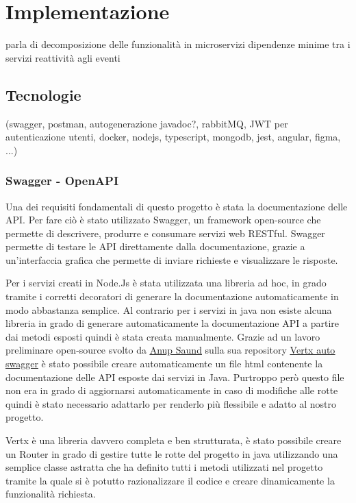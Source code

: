\chapter{Implementazione}
\label{ch:implementazione} %
parla di decomposizione delle funzionalità in microservizi
dipendenze minime tra i servizi
reattività agli eventi
\section{Tecnologie}
(swagger, postman, autogenerazione javadoc?, rabbitMQ, JWT per autenticazione utenti,
 docker, nodejs, typescript, mongodb, jest, angular, figma, ...)

\subsection{Swagger - OpenAPI}

Una dei requisiti fondamentali di questo progetto è stata la documentazione delle API.
Per fare ciò è stato utilizzato Swagger, un framework open-source che permette di descrivere, produrre e consumare servizi web RESTful. 
Swagger permette di testare le API direttamente dalla documentazione, grazie a un'interfaccia grafica che permette di inviare richieste e visualizzare le risposte.

Per i servizi creati in Node.Js è stata utilizzata una libreria ad hoc, in grado tramite i corretti decoratori di generare la documentazione automaticamente in modo abbastanza semplice.
Al contrario per i servizi in java non esiste alcuna libreria in grado di generare automaticamente la documentazione API a partire dai metodi esposti quindi è stata creata manualmente.
Grazie ad un lavoro preliminare open-source svolto da \href{https://github.com/anupsaund}{\underline{Anup Saund}} sulla sua repository \href{https://github.com/anupsaund/vertx-auto-swagger}{\underline{Vertx auto swagger}}
è stato possibile creare automaticamente un file html contenente la documentazione delle API esposte dai servizi in Java. 
Purtroppo però questo file non era in grado di aggiornarsi automaticamente in caso di modifiche alle rotte quindi è stato necessario adattarlo per renderlo più flessibile e adatto al nostro progetto.

Vertx è una libreria davvero completa e ben strutturata, è stato possibile creare un Router in grado di gestire tutte le rotte del progetto in java 
utilizzando una semplice classe astratta che ha definito tutti i metodi utilizzati nel progetto tramite la quale si è potutto razionalizzare il codice e creare dinamicamente la funzionalità richiesta.

